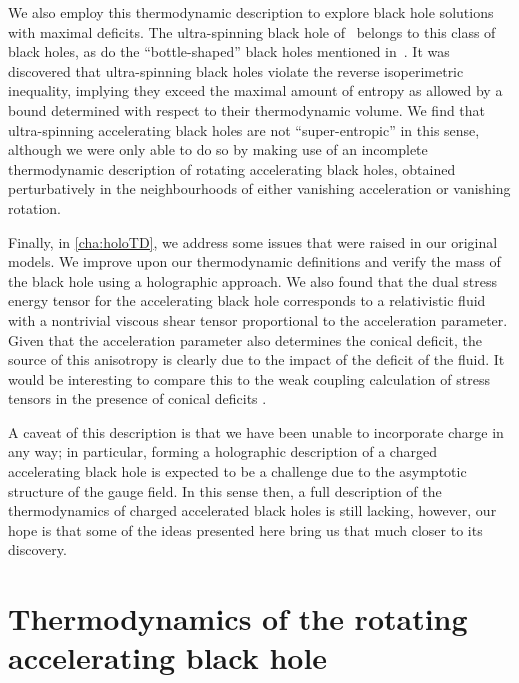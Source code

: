 \documentclass[
twoside,
openright,
frontopenright,
]{dmathesis}
\begin{document}
We also employ this thermodynamic description to explore black hole solutions
with maximal deficits. The ultra-spinning black hole
of~\cite{Klemm:2014rda,Gnecchi:2013mja,Hennigar:2014cfa} belongs to this class
of black holes, as do the ``bottle-shaped'' black holes mentioned
in~\cite{Hubeny:2009kz,Chen:2016rjt}. It was discovered that ultra-spinning
black holes violate the reverse isoperimetric inequality, implying they exceed
the maximal amount of entropy as allowed by a bound determined with respect to
their thermodynamic volume. We find that ultra-spinning accelerating black holes
are not ``super-entropic'' in this sense, although we were only able to do so by
making use of an incomplete
thermodynamic description of rotating accelerating black holes, obtained
perturbatively in the neighbourhoods of either vanishing acceleration or
vanishing rotation.

Finally, in \cref{cha:holoTD}, we address some issues that were raised in our
original models. We improve upon our thermodynamic definitions and verify the
mass of the black hole using a holographic approach. We also found that the dual
stress energy tensor for the accelerating black hole corresponds to a
relativistic fluid with a nontrivial viscous shear tensor proportional to the
acceleration parameter. Given that the acceleration parameter also determines
the conical deficit, the source of this anisotropy is clearly due to the impact
of the deficit of the fluid. It would be interesting to compare this to the weak
coupling calculation of stress tensors in the presence of conical deficits
\cite{Dowker:1977zj}.

A caveat of this description is that we have been unable to incorporate charge
in any way; in particular, forming a holographic description of a charged
accelerating black hole is expected to be a challenge due to the asymptotic
structure of the gauge field. In this sense then, a full description of the
thermodynamics of charged accelerated black holes is still lacking, however, our
hope is that some of the ideas presented here bring us that much closer to its
discovery.

\section{Thermodynamics of the rotating accelerating black hole}
\end{document}
